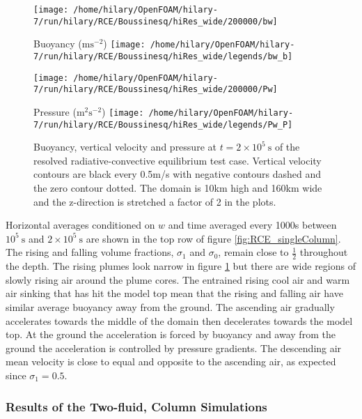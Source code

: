 \documentclass[draft]{agujournal2019}
\begin{document}
\noindent 
\begin{figure}
\texttt{[image: /home/hilary/OpenFOAM/hilary-7/run/hilary/RCE/Boussinesq/hiRes\_wide/200000/bw]}

Buoyancy ($\text{m}\text{s}^{-2}$) \texttt{[image: /home/hilary/OpenFOAM/hilary-7/run/hilary/RCE/Boussinesq/hiRes\_wide/legends/bw\_b]}

\texttt{[image: /home/hilary/OpenFOAM/hilary-7/run/hilary/RCE/Boussinesq/hiRes\_wide/200000/Pw]}

Pressure ($\text{m}^{2}\text{s}^{-2}$) \texttt{[image: /home/hilary/OpenFOAM/hilary-7/run/hilary/RCE/Boussinesq/hiRes\_wide/legends/Pw\_P]}

\caption{Buoyancy, vertical velocity and pressure at $t=2\times10^{5}\ \text{s}$
of the resolved radiative-convective equilibrium test case. Vertical
velocity contours are black every 0.5m/s with negative contours dashed
and the zero contour dotted. The domain is 10km high and 160km wide
and the z-direction is stretched a factor of 2 in the plots. \label{fig:RCE_resolved}}
\end{figure}

Horizontal averages conditioned on $w$ and time averaged every 1000s
between $10^{5}\ \text{s}$ and $2\times10^{5}\ \text{s}$ are shown
in the top row of figure \ref{fig:RCE_singleColumn}. The rising and
falling volume fractions, $\sigma_{1}$ and $\sigma_{0}$, remain
close to $\frac{1}{2}$ throughout the depth. The rising plumes look
narrow in figure \ref{fig:RCE_resolved} but there are wide regions
of slowly rising air around the plume cores. The entrained rising
cool air and warm air sinking that has hit the model top mean that
the rising and falling air have similar average buoyancy away from
the ground. The ascending air gradually accelerates towards the middle
of the domain then decelerates towards the model top. At the ground
the acceleration is forced by buoyancy and away from the ground the
acceleration is controlled by pressure gradients. The descending air
mean velocity is close to equal and opposite to the ascending air,
as expected since $\sigma_{1}=0.5$.

\subsubsection{Results of the Two-fluid,  Column Simulations}
\end{document}
